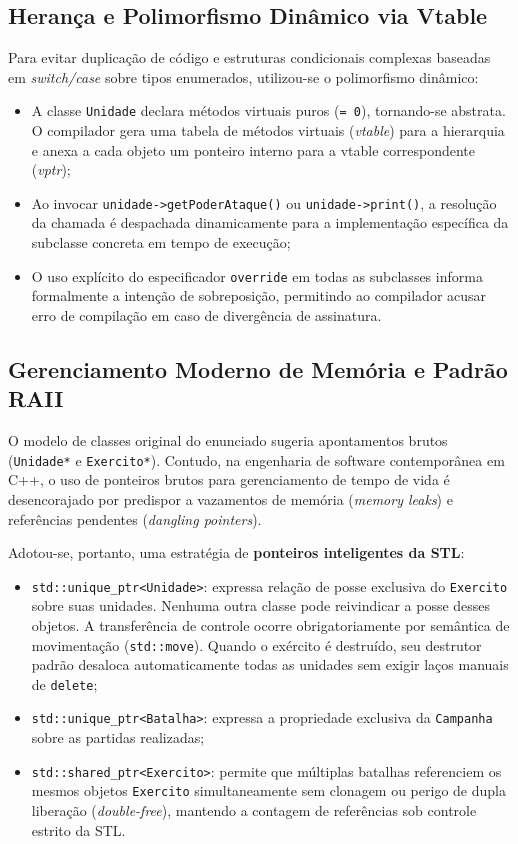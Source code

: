 \documentclass[12pt,a4paper]{article}
\begin{document}
\subsection{Herança e Polimorfismo Dinâmico via Vtable}
Para evitar duplicação de código e estruturas condicionais complexas baseadas em \textit{switch/case} sobre tipos enumerados, utilizou-se o polimorfismo dinâmico:
\begin{itemize}
    \item A classe \texttt{Unidade} declara métodos virtuais puros (\texttt{= 0}), tornando-se abstrata. O compilador gera uma tabela de métodos virtuais (\textit{vtable}) para a hierarquia e anexa a cada objeto um ponteiro interno para a vtable correspondente (\textit{vptr});
    \item Ao invocar \texttt{unidade->getPoderAtaque()} ou \texttt{unidade->print()}, a resolução da chamada é despachada dinamicamente para a implementação específica da subclasse concreta em tempo de execução;
    \item O uso explícito do especificador \texttt{override} em todas as subclasses informa formalmente a intenção de sobreposição, permitindo ao compilador acusar erro de compilação em caso de divergência de assinatura.
\end{itemize}

\subsection{Gerenciamento Moderno de Memória e Padrão RAII}
O modelo de classes original do enunciado sugeria apontamentos brutos (\texttt{Unidade*} e \texttt{Exercito*}). Contudo, na engenharia de software contemporânea em C++, o uso de ponteiros brutos para gerenciamento de tempo de vida é desencorajado por predispor a vazamentos de memória (\textit{memory leaks}) e referências pendentes (\textit{dangling pointers}).

Adotou-se, portanto, uma estratégia de \textbf{ponteiros inteligentes da STL}:
\begin{itemize}
    \item \texttt{std::unique\_ptr<Unidade>}: expressa relação de posse exclusiva do \texttt{Exercito} sobre suas unidades. Nenhuma outra classe pode reivindicar a posse desses objetos. A transferência de controle ocorre obrigatoriamente por semântica de movimentação (\texttt{std::move}). Quando o exército é destruído, seu destrutor padrão desaloca automaticamente todas as unidades sem exigir laços manuais de \texttt{delete};
    \item \texttt{std::unique\_ptr<Batalha>}: expressa a propriedade exclusiva da \texttt{Campanha} sobre as partidas realizadas;
    \item \texttt{std::shared\_ptr<Exercito>}: permite que múltiplas batalhas referenciem os mesmos objetos \texttt{Exercito} simultaneamente sem clonagem ou perigo de dupla liberação (\textit{double-free}), mantendo a contagem de referências sob controle estrito da STL.
\end{itemize}
\end{document}
